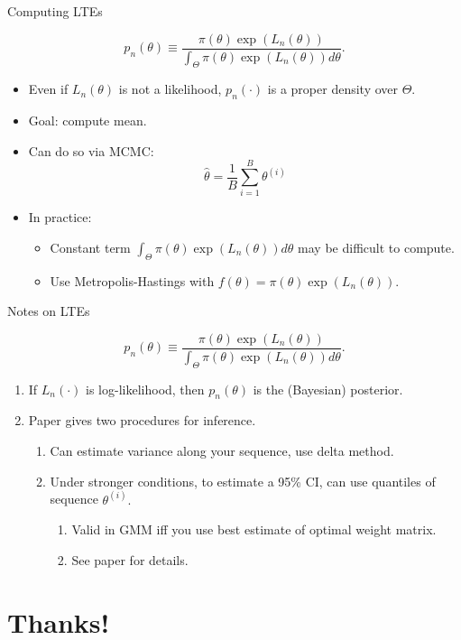 \documentclass[aspectratio=169]{beamer}
\begin{document}
\begin{frame}{Computing LTEs}

\[
p_{n}(\theta)\equiv\frac{\pi(\theta)\exp(L_{n}(\theta))}{\int_{\Theta}\pi(\theta)\exp(L_{n}(\theta))d\theta}.
\]

\begin{itemize}
\item Even if $L_{n}(\theta)$ is not a likelihood, $p_{n}(\cdot)$ is a
proper density over $\Theta.$ 
\item Goal: compute mean.
\item Can do so via MCMC: 
\[
\hat{\theta}=\frac{1}{B}\sum_{i=1}^{B}\theta^{(i)}
\]
\item In practice:
\begin{itemize}
\item Constant term $\int_{\Theta}\pi(\theta)\exp(L_{n}(\theta))d\theta$
may be difficult to compute.
\item Use Metropolis-Hastings with $f(\theta)=\pi(\theta)\exp(L_{n}(\theta)).$ 
\end{itemize}
\end{itemize}
\end{frame}
%
\begin{frame}{Notes on LTEs}

\[
p_{n}(\theta)\equiv\frac{\pi(\theta)\exp(L_{n}(\theta))}{\int_{\Theta}\pi(\theta)\exp(L_{n}(\theta))d\theta}.
\]

\begin{enumerate}
\item If $L_{n}(\cdot)$ is log-likelihood, then $p_{n}(\theta)$ is the
(Bayesian) posterior.
\item Paper gives two procedures for inference.
\begin{enumerate}
\item Can estimate variance along your sequence, use delta method.
\item Under stronger conditions, to estimate a 95\% CI, can use quantiles
of sequence $\theta^{(i)}.$
\begin{enumerate}
\item Valid in GMM iff you use best estimate of optimal weight matrix. 
\item See paper for details.
\end{enumerate}
\end{enumerate}
\end{enumerate}
\end{frame}


\section*{Thanks!}
\end{document}
